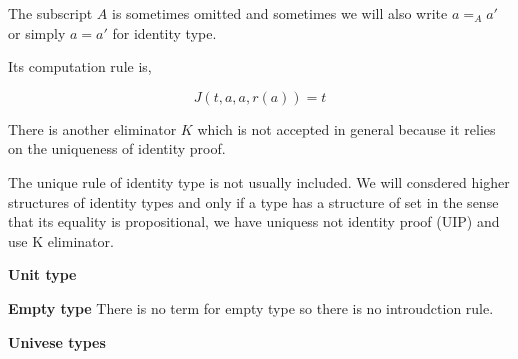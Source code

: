 The subscript $A$ is sometimes omitted and sometimes we will also write $a =_{A} a'$ or simply $a = a'$ for identity type.


Its computation rule is,

$$J(t,a,a,r(a)) = t$$


There is another eliminator $K$ which is not accepted in general because it relies on the uniqueness of identity proof.



The unique rule of identity type is not usually included. We will consdered higher structures of identity types and only if a type has a structure of set in the sense that its equality is propositional, we have uniquess not identity proof (UIP) and use K eliminator.

\textbf{Unit type}


\begin{multicols}{2}
\columnbreak
{}
\end{multicols}



\textbf{Empty type}
There is no term for empty type so there is no introudction rule.


\begin{multicols}{2}

\columnbreak


\end{multicols}

\textbf{Univese types}


\begin{multicols}{2}



\columnbreak


\end{multicols}

